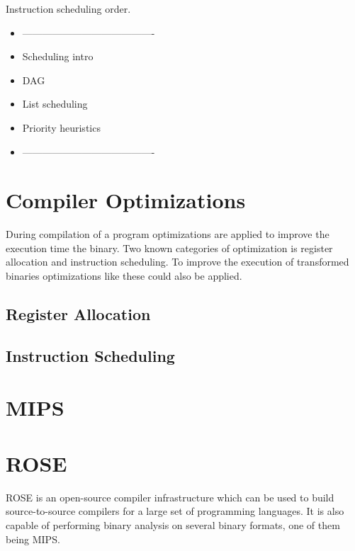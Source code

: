 Instruction scheduling order.
\begin{itemize}
    \item ----------------------------------------
    \item Scheduling intro
    \item DAG
    \item List scheduling
    \item Priority heuristics
    \item ----------------------------------------
\end{itemize}



\section{Compiler Optimizations}
During compilation of a program optimizations are applied
to improve the execution time the binary. Two known categories
of optimization is register allocation and instruction scheduling.
To improve the execution of transformed binaries optimizations
like these could also be applied.

\subsection{Register Allocation}


\subsection{Instruction Scheduling}


\section{MIPS}

\section{ROSE}
ROSE is an open-source compiler infrastructure which can be used to build
source-to-source compilers for a large set of programming languages.
It is also capable of performing binary analysis on several
binary formats, one of them being MIPS.
%

